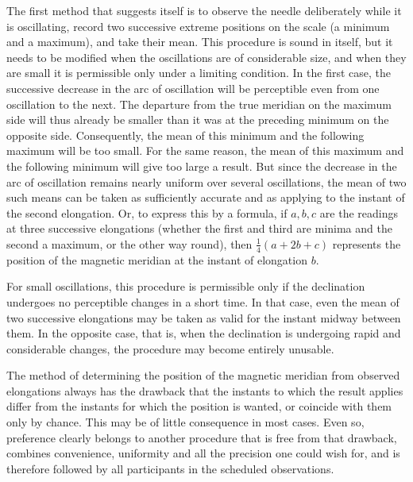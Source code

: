 The first method that suggests itself is to observe the needle deliberately while it is oscillating, record two successive extreme positions on the scale (a minimum and a maximum), and take their mean. This procedure is sound in itself, but it needs to be modified when the oscillations are of considerable size, and when they are small it is permissible only under a limiting condition. In the first case, the successive decrease in the arc of oscillation will be perceptible even from one oscillation to the next. The departure from the true meridian on the maximum side will thus already be smaller than it was at the preceding minimum on the opposite side. Consequently, the mean of this minimum and the following maximum will be too small. For the same reason, the mean of this maximum and the following minimum will give too large a result. But since the decrease in the arc of oscillation remains nearly uniform over several oscillations, the mean of two such means can be taken as sufficiently accurate and as applying to the instant of the second elongation. Or, to express this by a formula, if $a,b,c$ are the readings at three successive elongations (whether the first and third are minima and the second a maximum, or the other way round), then $\tfrac14(a+2b+c)$ represents the position of the magnetic meridian at the instant of elongation $b$.

For small oscillations, this procedure is permissible only if the declination undergoes no perceptible changes in a short time. In that case, even the mean of two successive elongations may be taken as valid for the instant midway between them. In the opposite case, that is, when the declination is undergoing rapid and considerable changes, the procedure may become entirely unusable.

The method of determining the position of the magnetic meridian from observed elongations always has the drawback that the instants to which the result applies differ from the instants for which the position is wanted, or coincide with them only by chance. This may be of little consequence in most cases. Even so, preference clearly belongs to another procedure that is free from that drawback, combines convenience, uniformity and all the precision one could wish for, and is therefore followed by all participants in the scheduled observations.


